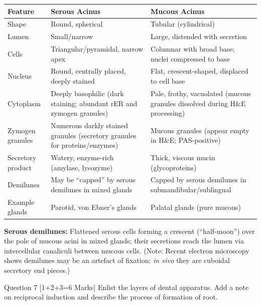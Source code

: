 \documentclass[11pt,a4paper]{article}
\begin{document}
\begin{ansbox}
\begin{center}
\begin{tabular}{p{3.5cm}p{5cm}p{5cm}}
\toprule
\textbf{Feature} & \textbf{Serous Acinus} & \textbf{Mucous Acinus} \\
\midrule
Shape & Round, spherical & Tubular (cylindrical) \\
Lumen & Small/narrow & Large, distended with secretion \\
Cells & Triangular/pyramidal, narrow apex & Columnar with broad base; nuclei compressed to base \\
Nucleus & Round, centrally placed, deeply stained & Flat, crescent-shaped, displaced to cell base \\
Cytoplasm & Deeply basophilic (dark staining; abundant rER and zymogen granules) & Pale, frothy, vacuolated (mucous granules dissolved during H\&E processing) \\
Zymogen granules & Numerous darkly stained granules (secretory granules for proteins/enzymes) & Mucous granules (appear empty in H\&E; PAS-positive) \\
Secretory product & Watery, enzyme-rich (amylase, lysozyme) & Thick, viscous mucin (glycoproteins) \\
Demilunes & May be ``capped'' by serous demilunes in mixed glands & Capped by serous demilunes in submandibular/sublingual \\
Example glands & Parotid, von Ebner's glands & Palatal glands (pure mucous) \\
\bottomrule
\end{tabular}
\end{center}

\textbf{Serous demilunes:} Flattened serous cells forming a crescent (``half-moon'') over the pole of mucous acini in mixed glands; their secretions reach the lumen via intercellular canaliculi between mucous cells. (Note: Recent electron microscopy shows demilunes may be an artefact of fixation; \textit{in vivo} they are cuboidal secretory end pieces.)
\end{ansbox}

\begin{qbox}{Question 7 [1+2+3=6 Marks]}
Enlist the layers of dental apparatus. Add a note on reciprocal induction and describe the process of formation of root.
\end{qbox}
\end{document}
